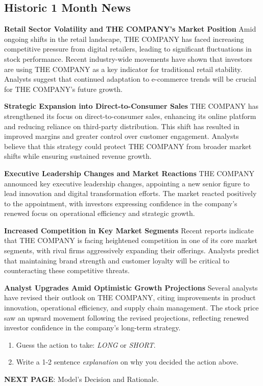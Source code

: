 \documentclass[8pt]{scrartcl}
\begin{document}
\subsection*{Historic 1 Month News}

\textbf{Retail Sector Volatility and THE COMPANY’s Market Position}
Amid ongoing shifts in the retail landscape, THE COMPANY has faced increasing competitive pressure from digital retailers, leading to significant fluctuations in stock performance. Recent industry-wide movements have shown that investors are using THE COMPANY as a key indicator for traditional retail stability. Analysts suggest that continued adaptation to e-commerce trends will be crucial for THE COMPANY’s future growth.

\textbf{Strategic Expansion into Direct-to-Consumer Sales}
THE COMPANY has strengthened its focus on direct-to-consumer sales, enhancing its online platform and reducing reliance on third-party distribution. This shift has resulted in improved margins and greater control over customer engagement. Analysts believe that this strategy could protect THE COMPANY from broader market shifts while ensuring sustained revenue growth.

\textbf{Executive Leadership Changes and Market Reactions}
THE COMPANY announced key executive leadership changes, appointing a new senior figure to lead innovation and digital transformation efforts. The market reacted positively to the appointment, with investors expressing confidence in the company’s renewed focus on operational efficiency and strategic growth.

\textbf{Increased Competition in Key Market Segments}
Recent reports indicate that THE COMPANY is facing heightened competition in one of its core market segments, with rival firms aggressively expanding their offerings. Analysts predict that maintaining brand strength and customer loyalty will be critical to counteracting these competitive threats.

\textbf{Analyst Upgrades Amid Optimistic Growth Projections}
Several analysts have revised their outlook on THE COMPANY, citing improvements in product innovation, operational efficiency, and supply chain management. The stock price saw an upward movement following the revised projections, reflecting renewed investor confidence in the company’s long-term strategy.

\begin{tcolorbox}[colback=blue!10, colframe=blue!60, title=\textbf{TASKS}, sharp corners=southwest]
\begin{enumerate}
    \item Guess the action to take: \textit{LONG} or \textit{SHORT}.
    \item Write a 1-2 sentence \textit{explanation} on why you decided the action above.
\end{enumerate}
\end{tcolorbox}
\textbf{NEXT PAGE}: Model's Decision and Rationale.
\end{document}
